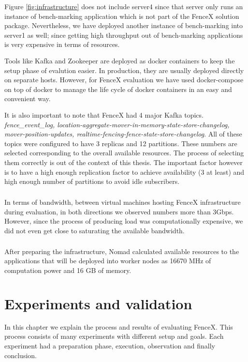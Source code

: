 \documentclass[a4]{report}
\begin{document}
    Figure \ref{fig:infrastructure} does not include server4 since that server only runs an instance of bench-marking
    application which is not part of the FenceX solution package.
    Nevertheless, we have deployed another instance of bench-marking into server1 as well;
    since getting high throughput out of bench-marking applications is very expensive in terms of resources.

    Tools like Kafka and Zookeeper are deployed as docker containers to keep the setup phase of evalution easier.
    In production, they are usually deployed directly on separate hosts.
    However, for FenceX evaluation we have used docker-compose on top of docker to manage the life cycle of docker
    containers in an easy and convenient way.

    It is also important to note that FenceX had 4 major Kafka topics.
    \textit{fence\_event\_log, location-aggregate-mover-in-memory-state-store-changelog, mover-position-updates,
        realtime-fencing-fence-state-store-changelog}.
    All of these topics were configured to have 3 replicas and 12 partitions.
    These numbers are selected corresponding to the overall available resources.
    The process of selecting them correctly is out of the context of this thesis.
    The important factor however is to have a high enough replication factor to achieve availability (3 at least) and
    high enough number of partitions to avoid idle subscribers.

    \paragraph{}
    In terms of bandwidth, between virtual machines hosting FenceX infrastructure during evaluation, in both
    directions we observed numbers more than 3Gbps.
    However, since the process of producing load was computationally expensive, we did not even get close to saturating
    the available bandwidth.

    \paragraph{}
    After preparing the infrastructure, Nomad calculated available resources to the applications that will be
    deployed into worker nodes as 16670 MHz of computation power and 16 GB of memory.


    \chapter{Experiments and validation}
    In this chapter we explain the process and results of evaluating FenceX.
    This process consists of many experiments with different setup and goals.
    Each experiment had a preparation phase, execution, observation and finally conclusion.
\end{document}
